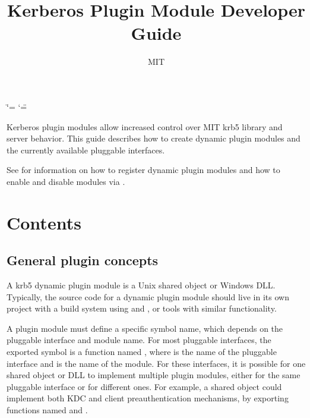 \documentclass[letterpaper,10pt,english]{sphinxmanual}
\title{Kerberos Plugin Module Developer Guide}
\date{ }
\author{MIT}
\begin{document}
\ifdefined\shorthandoff
  \ifnum\catcode`\=\string=\active\shorthandoff{=}\fi
  \ifnum\catcode`\"=\active{}\fi
\fi

\pagestyle{empty}
\sphinxmaketitle
\pagestyle{plain}
\sphinxtableofcontents
\pagestyle{normal}
\label{\detokenize{plugindev/index::doc}}


\sphinxAtStartPar
Kerberos plugin modules allow increased control over MIT krb5 library
and server behavior.  This guide describes how to create dynamic
plugin modules and the currently available pluggable interfaces.

\sphinxAtStartPar
See  for information on how to register dynamic
plugin modules and how to enable and disable modules via
.


\chapter{Contents}
\label{\detokenize{plugindev/index:contents}}
\sphinxstepscope


\section{General plugin concepts}
\label{\detokenize{plugindev/general:general-plugin-concepts}}\label{\detokenize{plugindev/general::doc}}
\sphinxAtStartPar
A krb5 dynamic plugin module is a Unix shared object or Windows DLL.
Typically, the source code for a dynamic plugin module should live in
its own project with a build system using  and , or
tools with similar functionality.

\sphinxAtStartPar
A plugin module must define a specific symbol name, which depends on
the pluggable interface and module name.  For most pluggable
interfaces, the exported symbol is a function named
, where  is the name of the
pluggable interface and  is the name of the module.  For these
interfaces, it is possible for one shared object or DLL to implement
multiple plugin modules, either for the same pluggable interface or
for different ones.  For example, a shared object could implement both
KDC and client preauthentication mechanisms, by exporting functions
named  and .
\end{document}
